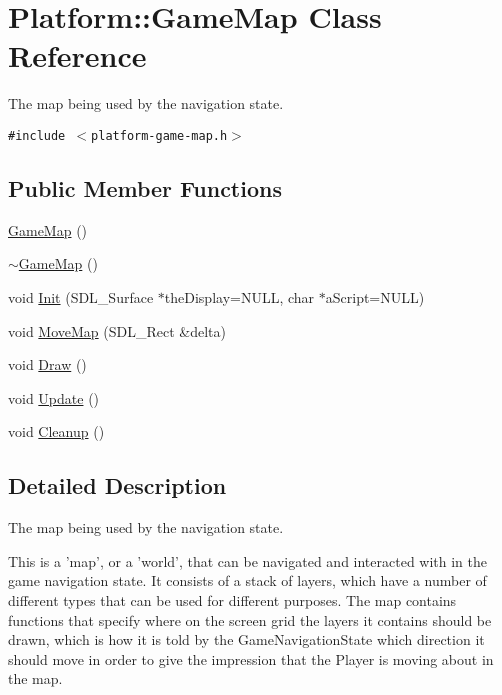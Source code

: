 \hypertarget{class_platform_1_1_game_map}{
\section{Platform::GameMap Class Reference}
\label{de/db6/class_platform_1_1_game_map}
}
The map being used by the navigation state.  


{\tt \#include $<$platform-game-map.h$>$}

\subsection*{Public Member Functions}
\begin{CompactItemize}
\item 
\hyperlink{class_platform_1_1_game_map_9388eca457dc888ce1370138b873a29e}{GameMap} ()
\item 
\hyperlink{class_platform_1_1_game_map_ad7094a561f89baf77d2015768dd9808}{$\sim$GameMap} ()
\item 
void \hyperlink{class_platform_1_1_game_map_0f5c16cce18b155235588af572cfba7f}{Init} (SDL\_\-Surface $\ast$theDisplay=NULL, char $\ast$aScript=NULL)
\item 
void \hyperlink{class_platform_1_1_game_map_76634e9c99fe04d801cc324ba0b0ed8a}{MoveMap} (SDL\_\-Rect \&delta)
\item 
void \hyperlink{class_platform_1_1_game_map_87236fed25c6729fd3d139170cbda6a0}{Draw} ()
\item 
void \hyperlink{class_platform_1_1_game_map_9d2b0044bfee1914f92ce62db4ff36a9}{Update} ()
\item 
void \hyperlink{class_platform_1_1_game_map_3a2969cccbc16f1ad11e505da961a105}{Cleanup} ()
\end{CompactItemize}


\subsection{Detailed Description}
The map being used by the navigation state. 

This is a 'map', or a 'world', that can be navigated and interacted with in the game navigation state. It consists of a stack of layers, which have a number of different types that can be used for different purposes. The map contains functions that specify where on the screen grid the layers it contains should be drawn, which is how it is told by the GameNavigationState which direction it should move in order to give the impression that the Player is moving about in the map. 

